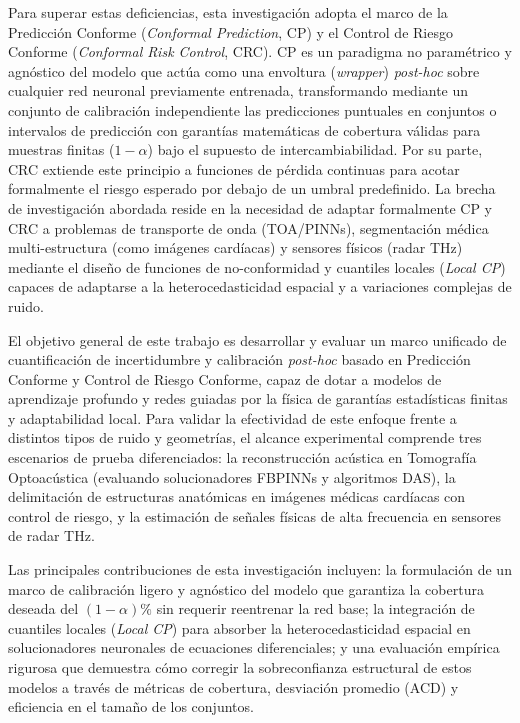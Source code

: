 Para superar estas deficiencias, esta investigación adopta el marco de la Predicción Conforme (\textit{Conformal Prediction}, CP) y el Control de Riesgo Conforme (\textit{Conformal Risk Control}, CRC). CP es un paradigma no paramétrico y agnóstico del modelo que actúa como una envoltura (\textit{wrapper}) \textit{post-hoc} sobre cualquier red neuronal previamente entrenada, transformando mediante un conjunto de calibración independiente las predicciones puntuales en conjuntos o intervalos de predicción con garantías matemáticas de cobertura válidas para muestras finitas ($1 - \alpha$) bajo el supuesto de intercambiabilidad. Por su parte, CRC extiende este principio a funciones de pérdida continuas para acotar formalmente el riesgo esperado por debajo de un umbral predefinido. La brecha de investigación abordada reside en la necesidad de adaptar formalmente CP y CRC a problemas de transporte de onda (TOA/PINNs), segmentación médica multi-estructura (como imágenes cardíacas) y sensores físicos (radar THz) mediante el diseño de funciones de no-conformidad y cuantiles locales (\textit{Local CP}) capaces de adaptarse a la heterocedasticidad espacial y a variaciones complejas de ruido.


El objetivo general de este trabajo es desarrollar y evaluar un marco unificado de cuantificación de incertidumbre y calibración \textit{post-hoc} basado en Predicción Conforme y Control de Riesgo Conforme, capaz de dotar a modelos de aprendizaje profundo y redes guiadas por la física de garantías estadísticas finitas y adaptabilidad local. Para validar la efectividad de este enfoque frente a distintos tipos de ruido y geometrías, el alcance experimental comprende tres escenarios de prueba diferenciados: la reconstrucción acústica en Tomografía Optoacústica (evaluando solucionadores FBPINNs y algoritmos DAS), la delimitación de estructuras anatómicas en imágenes médicas cardíacas con control de riesgo, y la estimación de señales físicas de alta frecuencia en sensores de radar THz.

Las principales contribuciones de esta investigación incluyen: la formulación de un marco de calibración ligero y agnóstico del modelo que garantiza la cobertura deseada del $(1-\alpha)\%$ sin requerir reentrenar la red base; la integración de cuantiles locales (\textit{Local CP}) para absorber la heterocedasticidad espacial en solucionadores neuronales de ecuaciones diferenciales; y una evaluación empírica rigurosa que demuestra cómo corregir la sobreconfianza estructural de estos modelos a través de métricas de cobertura, desviación promedio (ACD) y eficiencia en el tamaño de los conjuntos.

